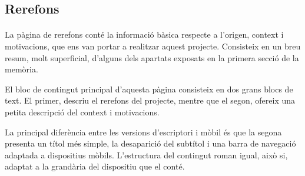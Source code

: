 \subsection{Rerefons}

    \paragraph{}
    La pàgina de rerefons conté la informació bàsica respecte a l'origen, context i motivacions, que ens van portar a realitzar aquest projecte. Consisteix en un breu resum, molt superficial, d’alguns dels apartats exposats en la primera secció de la memòria.

    El bloc de contingut principal d'aquesta pàgina consisteix en dos grans blocs de text. El primer, descriu el rerefons del projecte, mentre que el segon, ofereix una petita descripció del context i motivacions.

    La principal diferència entre les versions d'escriptori i mòbil és que la segona presenta un títol més simple, la desaparició del subtítol i una barra de navegació adaptada a dispositius mòbils. L'estructura del contingut roman igual, això si, adaptat a la grandària del dispositiu que el conté.

